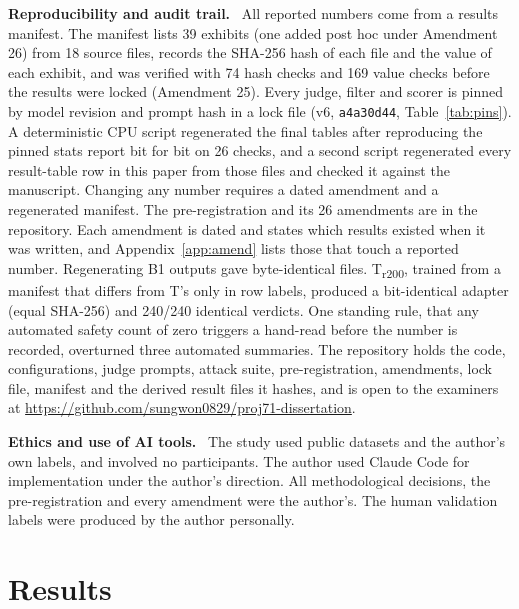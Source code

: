 \documentclass[10pt]{article} %
\newcommand{\Bo}{B1}
\newcommand{\T}{T}
\newcommand{\Trtwo}{T\textsubscript{r200}}
\newcommand{\lead}[1]{\textbf{#1}\ }
\begin{document}
\lead{Reproducibility and audit trail.} All reported numbers come from a results manifest. The manifest lists 39 exhibits (one added post hoc under Amendment 26) from 18 source files, records the SHA-256 hash of each file and the value of each exhibit, and was verified with 74 hash checks and 169 value checks before the results were locked (Amendment 25). Every judge, filter and scorer is pinned by model revision and prompt hash in a lock file (v6, \texttt{a4a30d44}, Table~\ref{tab:pins}). A deterministic CPU script regenerated the final tables after reproducing the pinned stats report bit for bit on 26 checks, and a second script regenerated every result-table row in this paper from those files and checked it against the manuscript. Changing any number requires a dated amendment and a regenerated manifest. The pre-registration and its 26 amendments are in the repository. Each amendment is dated and states which results existed when it was written, and Appendix~\ref{app:amend} lists those that touch a reported number. Regenerating \Bo{} outputs gave byte-identical files. \Trtwo{}, trained from a manifest that differs from \T{}'s only in row labels, produced a bit-identical adapter (equal SHA-256) and 240/240 identical verdicts. One standing rule, that any automated safety count of zero triggers a hand-read before the number is recorded, overturned three automated summaries. The repository holds the code, configurations, judge prompts, attack suite, pre-registration, amendments, lock file, manifest and the derived result files it hashes, and is open to the examiners at \url{https://github.com/sungwon0829/proj71-dissertation}.

\lead{Ethics and use of AI tools.} The study used public datasets and the author's own labels, and involved no participants. The author used Claude Code for implementation under the author's direction. All methodological decisions, the pre-registration and every amendment were the author's. The human validation labels were produced by the author personally.


\section{Results}
\label{sec:results}
\end{document}
